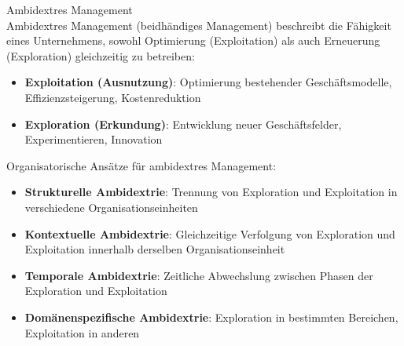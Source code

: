 \begin{concept}{Ambidextres Management}\\
Ambidextres Management (beidhändiges Management) beschreibt die Fähigkeit eines Unternehmens, sowohl Optimierung (Exploitation) als auch Erneuerung (Exploration) gleichzeitig zu betreiben:
\begin{itemize}
    \item \textbf{Exploitation (Ausnutzung)}: Optimierung bestehender Geschäftsmodelle, Effizienzsteigerung, Kostenreduktion
    \item \textbf{Exploration (Erkundung)}: Entwicklung neuer Geschäftsfelder, Experimentieren, Innovation
\end{itemize}

Organisatorische Ansätze für ambidextres Management:
\begin{itemize}
    \item \textbf{Strukturelle Ambidextrie}: Trennung von Exploration und Exploitation in verschiedene Organisationseinheiten
    \item \textbf{Kontextuelle Ambidextrie}: Gleichzeitige Verfolgung von Exploration und Exploitation innerhalb derselben Organisationseinheit
    \item \textbf{Temporale Ambidextrie}: Zeitliche Abwechslung zwischen Phasen der Exploration und Exploitation
    \item \textbf{Domänenspezifische Ambidextrie}: Exploration in bestimmten Bereichen, Exploitation in anderen
\end{itemize}
\end{concept}

